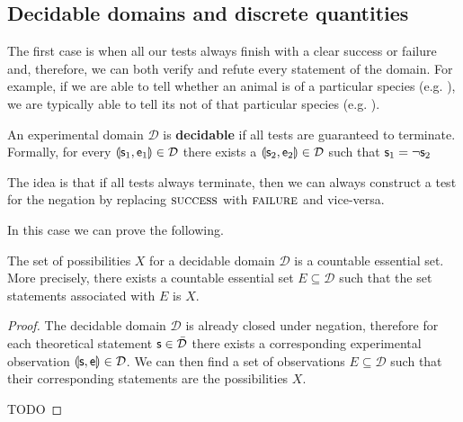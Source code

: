 \documentclass[11pt,letterpaper,fleqn]{memoir} %
\begin{document}
\subsection{Decidable domains and discrete quantities}

The first case is when all our tests always finish with a clear success or failure and, therefore, we can both verify and refute every statement of the domain. For example, if we are able to tell whether an animal is of a particular species (e.g. ), we are typically able to tell its not of that particular species (e.g. ).

\begin{mathSection}
	
	\begin{defn}
		An experimental domain $\mathcal{D}$ is \textbf{decidable} if all tests are guaranteed to terminate. Formally, for every $\llparenthesis \mathsf{s}_1, \mathsf{e}_1 \rrparenthesis \in \mathcal{D}$ there exists a $\llparenthesis \mathsf{s}_2, \mathsf{e}_2 \rrparenthesis \in \mathcal{D}$ such that $\mathsf{s}_1 = \neg \mathsf{s}_2$
	\end{defn}
	
	\begin{justification}
		The idea is that if all tests always terminate, then we can always construct a test for the negation by replacing $\textsc{success}$ with $\textsc{failure}$ and vice-versa.
	\end{justification}
	
\end{mathSection}

In this case we can prove the following.

\begin{mathSection}
	
	\begin{prop}
		The set of possibilities $X$ for a decidable domain $\mathcal{D}$ is a countable essential set. More precisely, there exists a countable essential set $E \subseteq \mathcal{D}$ such that the set statements associated with $E$ is $X$.
	\end{prop}
	
	\begin{proof}
		The decidable domain $\mathcal{D}$ is already closed under negation, therefore for each theoretical statement $\mathsf{s} \in \bar{\mathcal{D}}$ there exists a corresponding experimental observation $\llparenthesis \mathsf{s}, \mathsf{e} \rrparenthesis \in \mathcal{D}$. We can then find a set of observations $E\subseteq \mathcal{D}$ such that their corresponding statements are the possibilities $X$.
		
		TODO
	\end{proof}
	
\end{mathSection}
\end{document}
